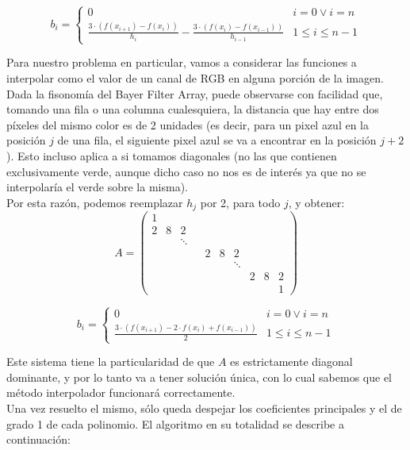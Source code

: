 \documentclass[a4paper]{article}
\begin{document}
\[
b_i =
\begin{cases}
0 & i = 0 \lor i = n \\
\frac{3\cdot(f(x_{i+1})-f(x_i))}{h_i} - \frac{3\cdot(f(x_i)-f(x_{i-1}))}{h_{i-1}} & 1 \leq i \leq n-1
\end{cases}
\]

\bigskip
Para nuestro problema en particular, vamos a considerar las funciones a interpolar como el valor de un canal de RGB en alguna porción de la imagen. Dada la fisonomía del Bayer Filter Array, puede observarse con facilidad que, tomando una fila o una columna cualesquiera, la distancia que hay entre dos píxeles del mismo color es de 2 unidades (es decir, para un pixel azul en la posición $j$ de una fila, el siguiente pixel azul se va a encontrar en la posición $j+2$). Esto incluso aplica a si tomamos diagonales (no las que contienen exclusivamente verde, aunque dicho caso no nos es de interés ya que no se interpolaría el verde sobre la misma). \\
Por esta razón, podemos reemplazar $h_j$ por 2, para todo $j$, y obtener: \\

\[
A = \left(
\begin{array}{cccccccccc}
1 &  &  &  &  &  &  & &  & \\
2 & 8 & 2 &   & & & & &  & \\
 &  & \ddots &  &  &  &  &  &  &  \\
 &  &  &  & 2 & 8 & 2 & &  & \\
 &  &  &  &  &  & \ddots &  &  &  \\
 &  &  &  &  & & & 2 & 8 & 2\\
 &  &  &  &  &  &  &  &  & 1
\end{array}
\right)
\]

\bigskip

\[
b_i =
\begin{cases}
0 & i = 0 \lor i = n \\
\frac{3\cdot(f(x_{i+1})-2\cdot f(x_i)+f(x_{i-1}))}{2} & 1 \leq i \leq n-1
\end{cases}
\]

\bigskip
Este sistema tiene la particularidad de que $A$ es estrictamente diagonal dominante, y por lo tanto va a tener solución única, con lo cual sabemos que el método interpolador funcionará correctamente. \\

Una vez resuelto el mismo, sólo queda despejar los coeficientes principales y el de grado 1 de cada polinomio. El algoritmo en su totalidad se describe a continuación:
\end{document}
